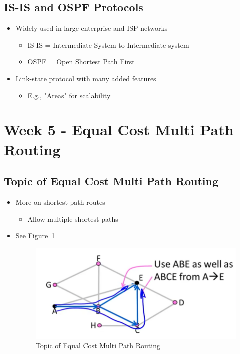 \documentclass[12pt]{ctexart}   %
\begin{document}
	\subsection{IS-IS and OSPF Protocols}
	\begin{itemize}
		\item Widely used in large enterprise and ISP networks
		\begin{itemize}
			\item IS-IS = Intermediate System to Intermediate system
			\item OSPF = Open Shortest Path First
		\end{itemize}
		
		\item Link-state protocol with many added features
		\begin{itemize}
			\item E.g., "Areas" for scalability
		\end{itemize}
	\end{itemize}

\section{Week 5 - Equal Cost Multi Path Routing}
	\subsection{ Topic of Equal Cost Multi Path Routing}
	\begin{itemize}
		\item More on shortest path routes
		\begin{itemize}
			\item Allow multiple shortest paths
		\end{itemize}
		\item See Figure~\ref{fig:5-7-1}
			
		\begin{figure}[h!] %
		\centering
		 \includegraphics[scale=0.7]{images/5-7-1}
		\caption{ Topic of Equal Cost Multi Path Routing }
		 \label{fig:5-7-1}
		 \end{figure}
	\end{itemize}
	
\end{document}
